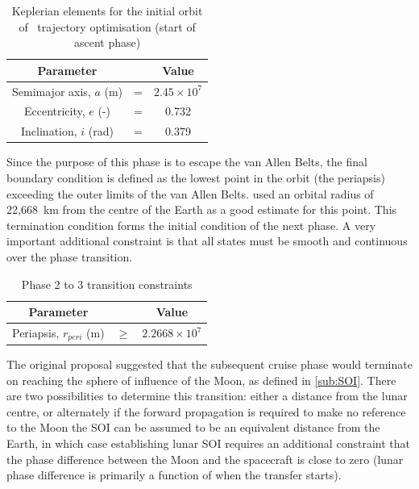 \begin{table}[h]
\caption{Keplerian elements for the initial orbit of \BW\ trajectory optimisation (start of ascent phase)}
\label{tab:Phase-2-constraints}
\begin{center}
\begin{tabular} {ccc}\toprule
Parameter & & Value\\\midrule
Semimajor axis, $a$ (m) &=& $2.45\times 10^7$\\
Eccentricity, $e$ (-) &=& 0.732\\
Inclination, $i$ (rad) &=& 0.379\\\bottomrule
\end{tabular}
\end{center}
\end{table}

Since the purpose of this phase is to escape the van Allen Belts, the final boundary condition is defined as the lowest point in the orbit (the periapsis) exceeding the outer limits of the van Allen Belts. \textcite{Letterio_thesis} used an orbital radius of 22,668~km from the centre of the Earth as a good estimate for this point. This termination condition forms the initial condition of the next phase. A very important additional constraint is that all states must be smooth and continuous over the phase transition.

\begin{table}[h]
\caption{Phase 2 to 3 transition constraints}
\label{tab:Phase-2-3-constraints}
\begin{center}
\begin{tabular} {ccc}\toprule
Parameter & & Value\\\midrule
Periapsis, $r_{peri}$ (m) &$\ge$& $2.2668\times 10^7$\\\bottomrule
\end{tabular}
\end{center}
\end{table}

The original proposal \parencite{Roeser2006} suggested that the subsequent cruise phase would terminate on reaching the sphere of influence of the Moon, as defined in \autoref{sub:SOI}. There are two possibilities to determine this transition: either a distance from the lunar centre, or alternately if the forward propagation is required to make no reference to the Moon the SOI can be assumed to be an equivalent distance from the Earth, in which case establishing lunar SOI requires an additional constraint that the phase difference between the Moon and the spacecraft is close to zero (lunar phase difference is primarily a function of when the transfer starts). 

